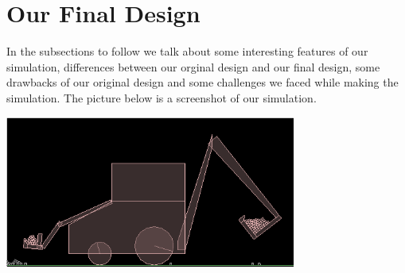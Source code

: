 \documentclass[11pt]{article}
\begin{document}
\section{Our Final Design}
	In the subsections to follow we talk about some interesting features of our simulation, differences between our orginal design and our final design, some drawbacks of our original design and some challenges we faced while making the simulation. The picture below is a screenshot of our simulation.
	\begin{center}\includegraphics[height=5cm]{FinalDesign2.png}\end{center}
\end{document}
